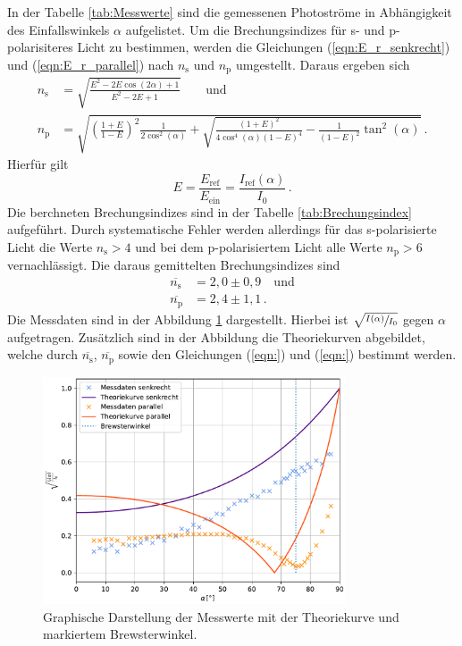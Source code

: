 In der Tabelle \ref{tab:Messwerte} sind die gemessenen Photoströme in Abhängigkeit des Einfallswinkels $\alpha$ aufgelistet.
Um die Brechungsindizes für s- und p-polarisiteres Licht zu bestimmen, werden die Gleichungen (\ref{eqn:E_r_senkrecht}) und (\ref{eqn:E_r_parallel}) nach $n_{\text{s}}$ und $n_{\text{p}}$
umgestellt. Daraus ergeben sich
\begin{align}
  n_{\text{s}} &= \sqrt{\frac{E^2 - 2E\cos(2\alpha) + 1}{E^2- 2E + 1}} \label{eqn:n_s} \qquad {\text{und}}\\
  n_{\text{p}} &= \sqrt{\left(\frac{1+E}{1-E}\right)^2 \frac{1}{2\cos^2(\alpha)} + \sqrt{\frac{(1+E)^2}{4\cos^4(\alpha)(1-E)^4}- \frac{1}{(1-E)^2} \tan^2(\alpha)}} \label{eqn:n_p}\,.
\end{align}
Hierfür gilt $$E = \frac{E_{\text{ref}}}{E_{\text{ein}}} = \frac{I_{\text{ref}}(\alpha)}{I_0}\,.$$
Die berchneten Brechungsindizes sind in der Tabelle \ref{tab:Brechungsindex} aufgeführt. Durch systematische Fehler werden allerdings für das s-polarisierte Licht
die Werte $n_{\text{s}} > 4$ und bei dem p-polarisiertem Licht alle Werte $n_{\text{p}} > 6$ vernachlässigt. Die daraus gemittelten Brechungsindizes sind
\begin{align*}
  \overline{n_{\text{s}}} &= 2,0\pm 0,9\quad \text{und}\\
  \overline{n_{\text{p}}} &= 2,4\pm 1,1\,.
\end{align*}
Die Messdaten sind in der Abbildung \ref{fig:plot} dargestellt. Hierbei ist $\sqrt{\sfrac{I(\alpha)}{I_0}}$ gegen $\alpha$ aufgetragen. Zusätzlich sind in der Abbildung
die Theoriekurven abgebildet, welche durch $\overline{n_{\text{s}}}$, $\overline{n_{\text{p}}}$ sowie den Gleichungen (\ref{eqn:}) und (\ref{eqn:}) bestimmt werden.
\begin{figure}
  \centering
  \includegraphics[width=0.8\textwidth]{plot.pdf}
  \caption{Graphische Darstellung der Messwerte mit der Theoriekurve und markiertem Brewsterwinkel.}
  \label{fig:plot}
\end{figure}

